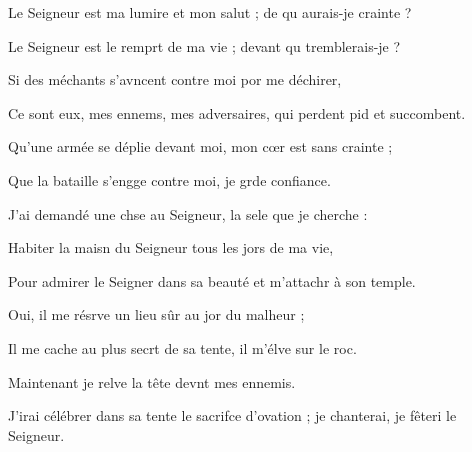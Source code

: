 \item Le Seigneur est ma lumire et mon salut ;\psstar{} de qu aurais-je crainte ?
\item Le Seigneur est le remprt de ma vie ;\psstar{} devant qu tremblerais-je ?
\item Si des méchants s’avncent contre moi\psstar{} por me déchirer,
\item Ce sont eux, mes ennems, mes adversaires,\psstar{} qui perdent pid et succombent.
\item Qu’une armée se déplie devant moi,\psstar{} mon cœr est sans crainte ;
\item Que la bataille s’engge contre moi,\psstar{} je grde confiance.
\item J’ai demandé une chse au Seigneur,\psstar{} la sele que je cherche :
\item Habiter la maisn du Seigneur\psstar{} tous les jors de ma vie,
\item Pour admirer le Seigner dans sa beauté\psstar{} et m’attachr à son temple.
\item Oui, il me résrve un lieu sûr\psstar{} au jor du malheur ;
\item Il me cache au plus secrt de sa tente,\psstar{} il m’élve sur le roc.
\item Maintenant je relve la tête\psstar{} devnt mes ennemis.
\item J’irai célébrer dans sa tente le sacrifce d’ovation ;\psstar{} je chanterai, je fêteri le Seigneur.